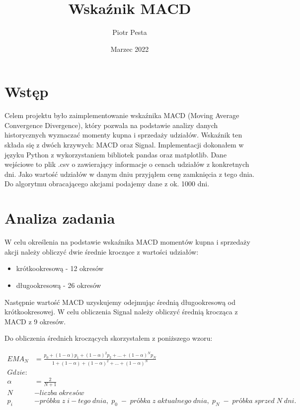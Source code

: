 \documentclass{article}
\title{Wskaźnik MACD}
\author{Piotr Pesta}
\date{Marzec 2022}
\begin{document}
\maketitle

\section{Wstęp}

    Celem projektu było zaimplementowanie wskaźnika MACD (Moving Average Convergence Divergence), który pozwala na podstawie analizy danych historycznych
    wyznaczać momenty kupna i sprzedaży udziałów. Wskaźnik ten składa się z dwóch krzywych: MACD oraz Signal.
    Implementacji dokonałem w języku Python z wykorzystaniem bibliotek pandas oraz matplotlib.
    Dane wejściowe to plik .csv o zawierający informacje o cenach udziałów z konkretnych dni. 
    Jako wartość udziałów w danym dniu przyjąłem cenę zamknięcia z tego dnia. Do algorytmu obracającego akcjami podajemy dane z ok. 1000 dni.

\section{Analiza zadania}

    W celu określenia na podstawie wskaźnika MACD momentów kupna i sprzedaży akcji należy obliczyć
    dwie średnie kroczące z wartości udziałów:
    \begin{itemize}
        \item krótkookresową - 12 okresów
        \item długookresową - 26 okresów
    \end{itemize}

    \noindent Następnie wartość MACD uzyskujemy odejmując średnią długookresową od krótkookresowej.
    W celu obliczenia Signal należy obliczyć średnią krocząca z MACD z 9 okresów. 


    Do obliczenia średnich kroczących skorzystałem z poniższego wzoru:
 
        

    \begin{align*} 
        EMA_{N} &= \frac{p_{0} + (1-\alpha)p_{1} + (1-\alpha)^2p_{2} + \ldots + (1-\alpha)^Np_{N}}{1 + (1-\alpha)+(1-\alpha)^2 + \ldots + (1-\alpha)^N} \\
        \mathit{Gdzie:} & \\
        \alpha &= \frac{2}{N + 1} \\
        N &- liczba \; okres \mathit{ó} w \\
        p_{i} &- pr\mathit{ó}bka \; z \; i-tego \;dnia, \;p_{0}\; - \; pr\mathit{ó}bka \;z \;aktualnego \;dnia, \;p_{N} \;-\;pr\mathit{ó}bka \;sprzed \;N \;dni.
    \end{align*}
\end{document}
